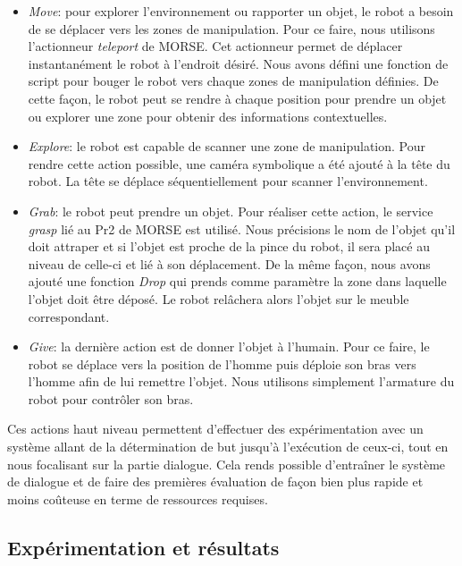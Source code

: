 \documentclass[a4paper,11pt,twoside]{StyleThese}
\begin{document}
\begin{itemize}

\item \textit{Move}: pour explorer l'environnement ou rapporter un objet, le robot a besoin de se déplacer vers les zones de manipulation. Pour ce faire, nous utilisons l'actionneur \textit{teleport} de MORSE. Cet actionneur permet de déplacer instantanément le robot à l'endroit désiré. Nous avons défini une fonction de script pour bouger le robot vers chaque zones de manipulation définies. De cette façon, le robot peut se rendre à chaque position pour prendre un objet ou explorer une zone pour obtenir des informations contextuelles.

\item \textit{Explore}: le robot est capable de scanner une zone de manipulation. Pour rendre cette action possible, une caméra symbolique a été ajouté à la tête du robot. La tête se déplace séquentiellement pour scanner l'environnement.

\item \textit{Grab}: le robot peut prendre un objet. Pour réaliser cette action, le service \textit{grasp} lié au Pr2 de MORSE est utilisé. Nous précisions le nom de l'objet qu'il doit attraper et si l'objet est proche de la pince du robot, il sera placé au niveau de celle-ci et lié à son déplacement. De la même façon, nous avons ajouté une fonction \textit{Drop} qui prends comme paramètre la zone dans laquelle l'objet doit être déposé. Le robot relâchera alors l'objet sur le meuble correspondant.

\item \textit{Give}: la dernière action est de donner l'objet à l'humain. Pour ce faire, le robot se déplace vers la position de l'homme puis déploie son bras vers l'homme afin de lui remettre l'objet. Nous utilisons simplement l'armature du robot pour contrôler son bras.
\end{itemize}

Ces actions haut niveau permettent d'effectuer des expérimentation avec un système allant de la détermination de but jusqu'à l'exécution de ceux-ci, tout en nous focalisant sur la partie dialogue. Cela rends possible d'entraîner le système de dialogue et de faire des premières évaluation de façon bien plus rapide et moins coûteuse en terme de ressources requises.

\subsection{Expérimentation et résultats}
\end{document}
